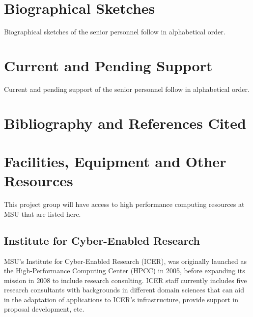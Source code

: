 \documentclass[11pt]{article}
\begin{document}
\section{Biographical Sketches}

Biographical sketches of the senior personnel follow in alphabetical order.


\clearpage
\section{Current and Pending Support}

Current and pending support of the senior personnel follow in alphabetical order.


\clearpage

\section{Bibliography and References Cited}




\clearpage






\section{Facilities, Equipment and Other Resources}

This project group will have access to high performance computing resources at MSU that are listed here.
\subsection{Institute for Cyber-Enabled Research}

MSU's Institute for Cyber-Enabled Research (ICER), was originally launched as
the High-Performance Computing Center (HPCC) in 2005, before expanding
its mission in 2008 to include research consulting. ICER staff currently
includes five research consultants with backgrounds in different domain
sciences that can aid in the adaptation of applications to ICER's
infrastructure, provide support in proposal development, etc.
\end{document}
